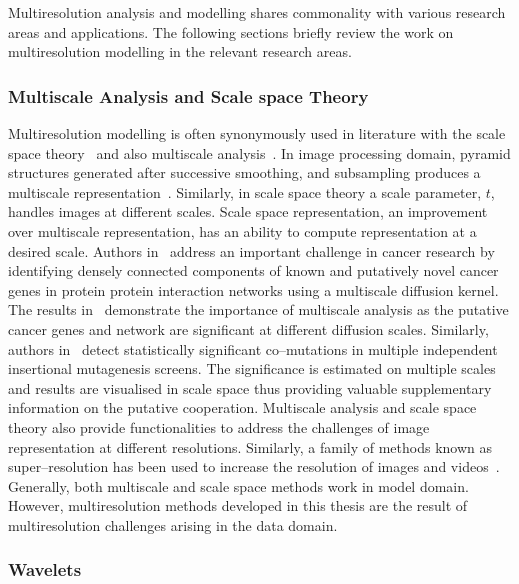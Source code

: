 Multiresolution analysis and modelling shares commonality with 
various research areas and applications. The following sections
briefly review the work on multiresolution modelling in the 
relevant research areas.

\subsubsection{Multiscale Analysis and Scale space Theory}
\label{ss:scalespace}

Multiresolution modelling is often synonymously used in 
literature with the scale space theory~\cite{Lindeberg94b} 
and also multiscale analysis~\cite{e2011principles}. 
In image processing domain, pyramid structures generated 
after successive smoothing, and subsampling produces a 
multiscale representation~\cite{Lindeberg94b}. Similarly, 
in scale space theory a scale parameter, $t$, handles 
images at different scales. Scale space representation, 
an improvement over multiscale representation, has an 
ability to compute representation at a desired scale. 
Authors in~\cite{babaei2013} address an important challenge
in cancer research by identifying densely connected 
components of known and putatively novel cancer genes
in protein protein interaction networks using a 
multiscale diffusion kernel. The results in~\cite{babaei2013}
demonstrate the importance of multiscale analysis as
the putative cancer genes and network are significant 
at different diffusion scales. Similarly, authors 
in~\cite{ridder07} detect statistically significant co--mutations
in multiple independent insertional mutagenesis screens. The 
significance is estimated on multiple scales and results are visualised
in  scale space thus providing valuable supplementary information 
on the putative cooperation.
Multiscale analysis and scale space theory
also provide functionalities to address
the challenges of image representation at different resolutions. 
Similarly, a family of methods known 
as super--resolution has been used to increase the resolution 
of images and videos~\cite{milanfar2010super}.
Generally, both 
multiscale and scale space methods work in model 
domain. 
However, multiresolution methods developed in this thesis
are the result of multiresolution challenges arising in 
the data domain. 


\subsubsection{Wavelets}
\label{ss:wavelets}


